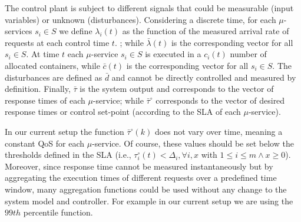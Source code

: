 

The control plant is subject to different signals that could be measurable (input variables) or unknown (disturbances). Considering a discrete time, for each $\mu$-services $s_i \in S$ we define $\lambda_i(t)$ as the function of the measured arrival rate of requests at each control time $t$.
; while $\bar{\lambda}(t)$ is the corresponding vector for all $s_i \in S$. 
At time $t$ each $\mu$-service $s_i \in S$ is executed in a $c_i(t)$ number of allocated containers, while $\bar{c}(t)$ is the corresponding vector for all $s_i \in S$. The disturbances are defined as $\bar{d}$ and cannot be directly controlled and measured by definition. Finally, $\bar{\tau}$ is the system output and corresponds to the vector of response times of each $\mu$-service; while $\bar{\tau}^\circ$ corresponds to the vector of desired response times or control set-point (according to the SLA of each $\mu$-service). 

In our current setup the function $\bar{\tau}^\circ(k)$ does not vary over time, meaning a constant QoS for each  $\mu$-service. Of course, these values should be set below the thresholds defined in the SLA (i.e., ${\tau}^\circ_i(t) < \Delta_i, \forall i, x$ with $ 1 \le i \le m \wedge x \ge 0$). Moreover, since response time cannot be measured instantaneously but by aggregating the execution times of different requests over a predefined time window, many aggregation functions could be used without any change to the system model and controller. For example in our current setup we are using the $99th$ percentile function. 

